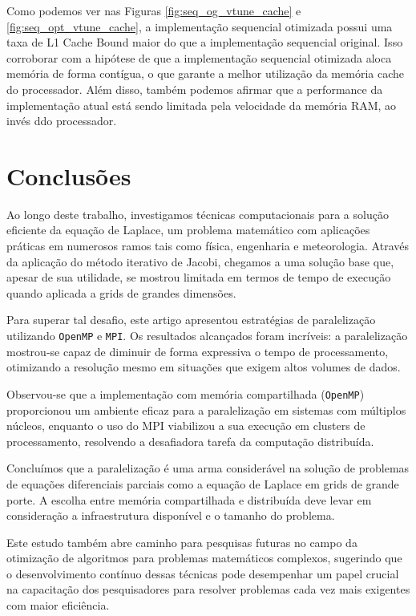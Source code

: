 \documentclass[conference]{IEEEtran}
\begin{document}
Como podemos ver nas Figuras \ref{fig:seq_og_vtune_cache} e \ref{fig:seq_opt_vtune_cache}, a implementação sequencial otimizada possui uma taxa de L1 Cache Bound maior do que a implementação sequencial original. Isso corroborar com a hipótese de que a implementação sequencial otimizada aloca memória de forma contígua, o que garante a melhor utilização da memória cache do processador. Além disso, também podemos afirmar que a performance da implementação atual está sendo limitada pela velocidade da memória RAM, ao invés ddo processador.

\section{Conclusões}

Ao longo deste trabalho, investigamos técnicas computacionais para a solução eficiente da equação de Laplace, um problema matemático com aplicações práticas em numerosos ramos tais como física, engenharia e meteorologia. Através da aplicação do método iterativo de Jacobi, chegamos a uma solução base que, apesar de sua utilidade, se mostrou limitada em termos de tempo de execução quando aplicada a grids de grandes dimensões.

Para superar tal desafio, este artigo apresentou estratégias de paralelização utilizando \texttt{OpenMP} e \texttt{MPI}. Os resultados alcançados foram incríveis: a paralelização mostrou-se capaz de diminuir de forma expressiva o tempo de processamento, otimizando a resolução mesmo em situações que exigem altos volumes de dados.

Observou-se que a implementação com memória compartilhada (\texttt{OpenMP}) proporcionou um ambiente eficaz para a paralelização em sistemas com múltiplos núcleos, enquanto o uso do MPI viabilizou a sua execução em clusters de processamento, resolvendo a desafiadora tarefa da computação distribuída.

Concluímos que a paralelização é uma arma considerável na solução de problemas de equações diferenciais parciais como a equação de Laplace em grids de grande porte. A escolha entre memória compartilhada e distribuída deve levar em consideração a infraestrutura disponível e o tamanho do problema.

Este estudo também abre caminho para pesquisas futuras no campo da otimização de algoritmos para problemas matemáticos complexos, sugerindo que o desenvolvimento contínuo dessas técnicas pode desempenhar um papel crucial na capacitação dos pesquisadores para resolver problemas cada vez mais exigentes com maior eficiência.
\end{document}
